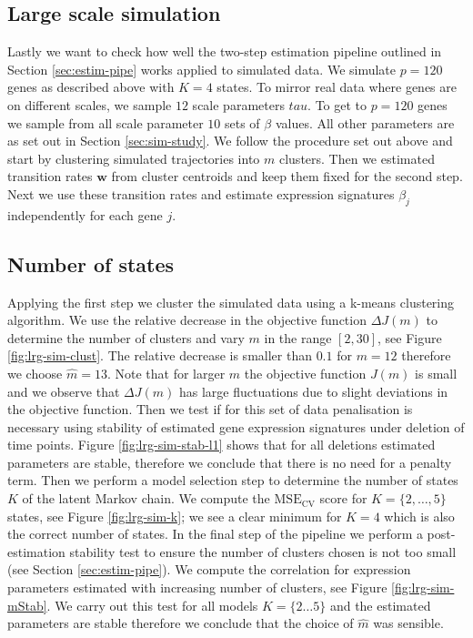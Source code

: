 \subsection{Large scale simulation}
\label{sec:large-scale-model}

Lastly we want to check how well the two-step estimation pipeline outlined in Section \ref{sec:estim-pipe} works applied to simulated data. We simulate $p=120$ genes as described above with $K=4$ states. To mirror real data where genes are on different scales, we sample $12$ scale parameters $tau$. To get to $p=120$ genes we sample from all scale parameter $10$ sets of $\beta$ values. All other parameters are as set out in Section \ref{sec:sim-study}. We follow the procedure set out above and start by clustering simulated trajectories into $m$ clusters. Then we estimated transition rates $\mathbf{w}$ from cluster centroids and keep them fixed for the second step. Next we use these transition rates and estimate expression signatures $\beta_j$ independently for each gene $j$.


\subsection{Number of states}
\label{sec:number-states-res}

Applying the first step we cluster the simulated data using a k-means clustering algorithm. We use the relative decrease in the objective function $\Delta J(m)$ to determine the number of clusters and vary $m$ in the range $[2, 30]$, see Figure \ref{fig:lrg-sim-clust}. The relative decrease is smaller than $0.1$ for $m=12$ therefore we choose $\hat{m} = 13$. Note that for larger $m$ the objective function $J(m)$ is small and we observe that $\Delta J(m)$ has large fluctuations due to slight deviations in the objective function. Then we test if for this set of data penalisation is necessary using stability of estimated gene expression signatures under deletion of time points. Figure \ref{fig:lrg-sim-stab-l1} shows that for all deletions estimated parameters are stable, therefore we conclude that there is no need for a penalty term. Then we perform a model selection step to determine the number of states $K$ of the latent Markov chain. We compute the $\mathrm{MSE_{CV}}$ score for $K=\lbrace 2, \ldots, 5 \rbrace$ states, see Figure \ref{fig:lrg-sim-k}; we see a clear minimum for $K=4$ which is also the correct number of states. In the final step of the pipeline we perform a post-estimation stability test to ensure the number of clusters chosen is not too small (see Section \ref{sec:estim-pipe}). We compute the correlation for expression parameters estimated with increasing number of clusters, see Figure \ref{fig:lrg-sim-mStab}. We carry out this test for all models $K = \lbrace 2 \ldots 5\rbrace $ and the estimated parameters are stable therefore we conclude that the choice of $\hat{m}$ was sensible. 

